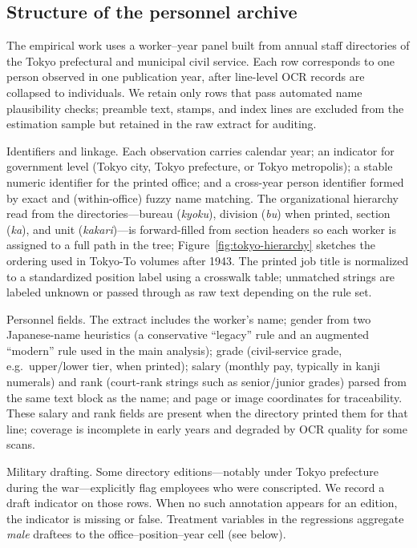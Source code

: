 \subsection{Structure of the personnel archive}

The empirical work uses a worker--year panel built from annual staff directories of the Tokyo prefectural and municipal civil service. Each row corresponds to one person observed in one publication year, after line-level OCR records are collapsed to individuals. We retain only rows that pass automated name plausibility checks; preamble text, stamps, and index lines are excluded from the estimation sample but retained in the raw extract for auditing.

Identifiers and linkage. Each observation carries calendar year; an indicator for government level (Tokyo city, Tokyo prefecture, or Tokyo metropolis); a stable numeric identifier for the printed office; and a cross-year person identifier formed by exact and (within-office) fuzzy name matching. The organizational hierarchy read from the directories---bureau (\emph{kyoku}), division (\emph{bu}) when printed, section (\emph{ka}), and unit (\emph{kakari})---is forward-filled from section headers so each worker is assigned to a full path in the tree; Figure~\ref{fig:tokyo-hierarchy} sketches the ordering used in Tokyo-To volumes after 1943. The printed job title is normalized to a standardized position label using a crosswalk table; unmatched strings are labeled unknown or passed through as raw text depending on the rule set.

Personnel fields. The extract includes the worker's name; gender from two Japanese-name heuristics (a conservative ``legacy'' rule and an augmented ``modern'' rule used in the main analysis); grade (civil-service grade, e.g.\ upper/lower tier, when printed); salary (monthly pay, typically in kanji numerals) and rank (court-rank strings such as senior/junior grades) parsed from the same text block as the name; and page or image coordinates for traceability. These salary and rank fields are present when the directory printed them for that line; coverage is incomplete in early years and degraded by OCR quality for some scans.

Military drafting. Some directory editions---notably under Tokyo prefecture during the war---explicitly flag employees who were conscripted. We record a draft indicator on those rows. When no such annotation appears for an edition, the indicator is missing or false. Treatment variables in the regressions aggregate \emph{male} draftees to the office--position--year cell (see below).

